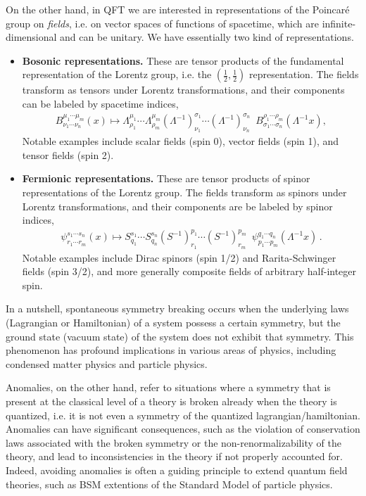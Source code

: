 \documentclass[../QFT_main.tex]{subfiles}
\begin{document}
\begin{mytheorem}
On the other hand, in QFT we are interested in representations of the Poincaré group on \emph{fields}, i.e. on vector spaces of functions of spacetime, which are infinite-dimensional and can be unitary.
We have essentially two kind of representations.
\begin{itemize}
    \item[] \textbf{Bosonic representations.} These are tensor products of the fundamental representation of the Lorentz group, i.e. the $(\frac{1}{2},\frac{1}{2})$ representation. The fields transform as tensors under Lorentz transformations, and their components can be labeled by spacetime indices,
    {\small\begin{align}
        B^{\mu_1\cdots\mu_m}_{\nu_1\cdots \nu_n}(x)\mapsto \Lambda^{\mu_1}_{\rho_1}\cdots \Lambda^{\mu_m}_{\rho_m}(\Lambda^{-1})^{\sigma_1}_{\nu_1}\cdots (\Lambda^{-1})^{\sigma_n}_{\nu_n}\,\,\,B^{\rho_1\cdots\rho_m}_{\sigma_1\cdots \sigma_n}(\Lambda^{-1}x),
    \end{align}}
    Notable examples include scalar fields (spin 0), vector fields (spin 1), and tensor fields (spin 2).
    \item[] \textbf{Fermionic representations.} These are tensor products of spinor representations of the Lorentz group.
    The fields transform as spinors under Lorentz transformations, and their components are be labeled by spinor indices,
    {\small\begin{align}
        \psi_{r_1\cdots r_m}^{s_1\cdots s_n}(x)\mapsto S^{s_1}_{q_1}\cdots S^{s_n}_{q_n}(S^{-1})^{p_1}_{r_1}\cdots (S^{-1})^{p_m}_{r_m}\,\,\,\psi_{p_1\cdots p_m}^{q_1\cdots q_n}(\Lambda^{-1}x)\,.
    \end{align}}
    Notable examples include Dirac spinors (spin 1/2) and Rarita-Schwinger fields (spin 3/2), and more generally composite fields of arbitrary half-integer spin.
\end{itemize}
\end{mytheorem}


\begin{mytheorem}
In a nutshell, spontaneous symmetry breaking occurs when the underlying laws (Lagrangian or Hamiltonian) of a system possess a certain symmetry, but the ground state (vacuum state) of the system does not exhibit that symmetry.
This phenomenon has profound implications in various areas of physics, including condensed matter physics and particle physics.

Anomalies, on the other hand, refer to situations where a symmetry that is present at the classical level of a theory is broken already when the theory is quantized, i.e. it is not even a symmetry of the quantized lagrangian/hamiltonian.
Anomalies can have significant consequences, such as the violation of conservation laws associated with the broken symmetry or the non-renormalizability of the theory, and lead to inconsistencies in the theory if not properly accounted for.
Indeed, avoiding anomalies is often a guiding principle to extend quantum field theories, such as BSM extentions of the Standard Model of particle physics.
\end{mytheorem}
\end{document}
